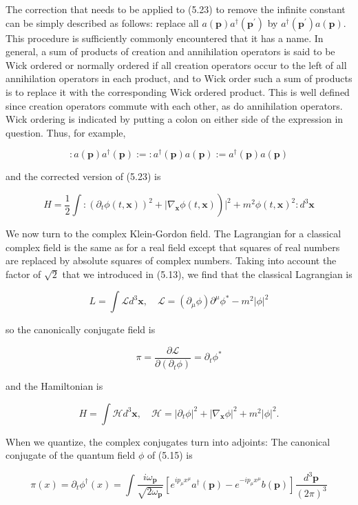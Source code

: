 \documentclass[10pt, letterpaper]{article}
\begin{document}
The correction that needs to be applied to (5.23) to remove the infinite constant can be simply described as follows: replace all $a(\mathbf{p}) a^{\dagger}\left(\mathbf{p}^{\prime}\right)$ by $a^{\dagger}\left(\mathbf{p}^{\prime}\right) a(\mathbf{p})$. This procedure is sufficiently commonly encountered that it has a name. In general, a sum of products of creation and annihilation operators is said to be Wick ordered or normally ordered if all creation operators occur to the left of all annihilation operators in each product, and to Wick order such a sum of products is to replace it with the corresponding Wick ordered product. This is well defined since creation operators commute with each other, as do annihilation operators. Wick ordering is indicated by putting a colon on either side of the expression in question. Thus, for example,

$$
: a(\mathbf{p}) a^{\dagger}(\mathbf{p}):=: a^{\dagger}(\mathbf{p}) a(\mathbf{p}):=a^{\dagger}(\mathbf{p}) a(\mathbf{p})
$$

and the corrected version of (5.23) is

$$
\left.H=\frac{1}{2} \int:\left(\partial_{t} \phi(t, \mathbf{x})\right)^{2}+\mid \nabla_{\mathbf{x}} \phi(t, \mathbf{x})\right)\left.\right|^{2}+m^{2} \phi(t, \mathbf{x})^{2}: d^{3} \mathbf{x}
$$

We now turn to the complex Klein-Gordon field. The Lagrangian for a classical complex field is the same as for a real field except that squares of real numbers are replaced by absolute squares of complex numbers. Taking into account the factor of $\sqrt{2}$ that we introduced in (5.13), we find that the classical Lagrangian is

$$
L=\int \mathcal{L} d^{3} \mathbf{x}, \quad \mathcal{L}=\left(\partial_{\mu} \phi\right) \partial^{\mu} \phi^{*}-m^{2}|\phi|^{2}
$$

so the canonically conjugate field is

$$
\pi=\frac{\partial \mathcal{L}}{\partial\left(\partial_{t} \phi\right)}=\partial_{t} \phi^{*}
$$

and the Hamiltonian is

$$
H=\int \mathcal{H} d^{3} \mathbf{x}, \quad \mathcal{H}=\left|\partial_{t} \phi\right|^{2}+\left|\nabla_{\mathbf{x}} \phi\right|^{2}+m^{2}|\phi|^{2} .
$$

When we quantize, the complex conjugates turn into adjoints: The canonical conjugate of the quantum field $\phi$ of (5.15) is

$$
\pi(x)=\partial_{t} \phi^{\dagger}(x)=\int \frac{i \omega_{\mathbf{p}}}{\sqrt{2 \omega_{\mathbf{p}}}}\left[e^{i p_{\mu} x^{\mu}} a^{\dagger}(\mathbf{p})-e^{-i p_{\mu} x^{\mu}} b(\mathbf{p})\right] \frac{d^{3} \mathbf{p}}{(2 \pi)^{3}}
$$
\end{document}
